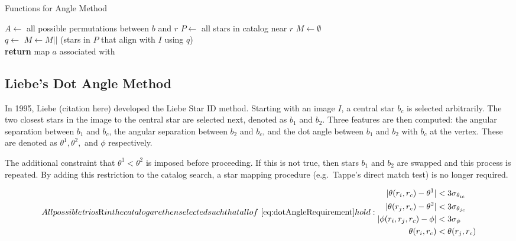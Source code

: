 \begin{algorithm} 
    \caption{Functions for Angle Method}\label{algorithm:angleHelper}
    \begin{algorithmic}[1]
        \State $A \gets $ all possible permutations between $b$ and $r$
        \State $P \gets $ all stars in catalog near $r$
        \State $M \gets \emptyset$
        \\
        \State $q \gets $ 
        \State $M \gets M ||$ (stars in $P$ that align with $I$ using $q$)
        \EndFor
        \\
        \State \textbf{return} map $a$ associated with 
        \EndFunction
    \end{algorithmic}
\end{algorithm}

\subsection{Liebe's Dot Angle Method}\label{subsec:liebe'sDotAngleMethod}
In 1995, Liebe (citation here) developed the Liebe Star ID method.
Starting with an image $I$, a central star $b_c$ is selected arbitrarily.
The two closest stars in the image to the central star are selected next, denoted as $b_1$ and $b_2$.
Three features are then computed: the angular separation between $b_1$ and $b_c$, the angular separation between
$b_2$ and $b_c$, and the dot angle between $b_1$ and $b_2$ with $b_c$ at the vertex.
These are denoted as $\theta^1, \theta^2,$ and $\phi$ respectively.

The additional constraint that $\theta^1 < \theta^2$ is imposed before proceeding.
If this is not true, then stars $b_1$ and $b_2$ are swapped and this process is repeated.
By adding this restriction to the catalog search, a star mapping procedure (e.g.\ Tappe's direct match test) is no
longer required.

\begin{subequations}
    \label{eq:dotAngleRequirement}

    All possible \textit{trios} $R$ in the catalog are then selected such that all
    of~\autoref{eq:dotAngleRequirement} hold:
    \begin{align}
        |\theta(r_i, r_c) - \theta^1| &< 3 \sigma_{\theta_{ic}} \\
        |\theta(r_j, r_c) - \theta^2| &< 3 \sigma_{\theta_{jc}} \\
        |\phi(r_i, r_j, r_c) - \phi| &< 3 \sigma_{\phi} \\
        \theta(r_i, r_c) &< \theta(r_j, r_c)
    \end{align}
\end{subequations}

